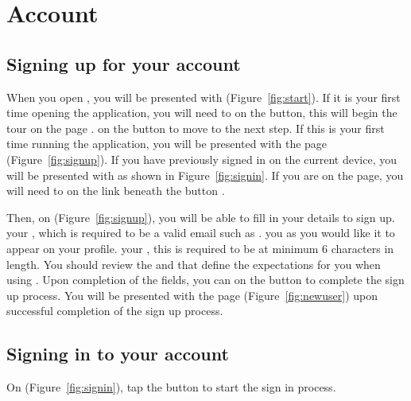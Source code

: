 \section{Account}
\label{sec:account}

\subsection{Signing up for your account}
\label{sec:signup}
When you open \Friending, you will be presented with  (Figure~\ref{fig:start}). If it is your first time opening the application, you will need to  on the  button, this will begin the tour on the page .  on the  button to move to the next step. If this is your first time running the \Friending application, you will be presented with the  page (Figure~\ref{fig:signup}).  If you have previously signed in on the current device, you will be presented with  as shown in Figure~\ref{fig:signin}. If you are on the  page, you will need to  on the  link beneath the button .


Then, on  (Figure~\ref{fig:signup}), you will be able to fill in your details to sign up.  your , which is required to be a valid email such as .  you  as you would like it to appear on your profile.   your , this is required to be at minimum 6 characters in length.  You should review the  and  that define the expectations for you when using \Friending. Upon completion of the fields, you can  on the  button to complete the sign up process.  You will be presented with the  page (Figure~\ref{fig:newuser}) upon successful completion of the sign up process.

\subsection{Signing in to your account}
\label{sec:signin}
On \Screenshot{\fileStart} (Figure~\ref{fig:signin}), tap the  button to start the sign in process.

